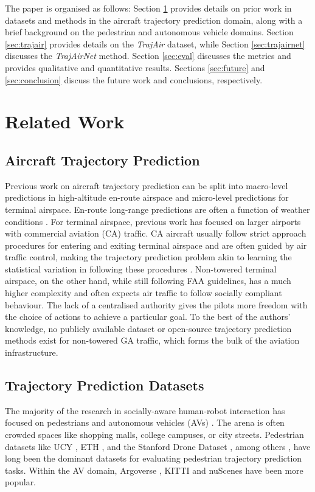 \documentclass[letterpaper, 10 pt, conference]{ieeeconf}
\begin{document}
The paper is organised as follows: Section \ref{sec:related_works} provides details on prior work in datasets and methods in the aircraft trajectory prediction domain, along with a brief background on the pedestrian and autonomous vehicle domains. Section \ref{sec:trajair} provides details on the \textit{TrajAir} dataset, while Section \ref{sec:trajairnet} discusses the \textit{TrajAirNet} method. Section \ref{sec:eval} discusses the metrics and provides qualitative and quantitative results. Sections \ref{sec:future} and \ref{sec:conclusion} discuss the future work and conclusions, respectively.

\section{Related Work}\label{sec:related_works}
\subsection{Aircraft Trajectory Prediction}
Previous work on aircraft trajectory prediction can be split into macro-level predictions in high-altitude en-route airspace and micro-level predictions for terminal airspace. En-route long-range predictions are often a function of weather conditions \cite{ayhan2016aircraft,pang2019recurrent,franco2018probabilistic,pang2020conditional}. For terminal airspace, previous work has focused on larger airports with commercial aviation (CA) traffic. CA aircraft usually follow strict approach procedures for entering and exiting terminal airspace and are often guided by air traffic control, making the trajectory prediction problem akin to learning the statistical variation in following these procedures \cite{zeng2020deep,barratt2018learning,alligier2018learning}. Non-towered terminal airspace, on the other hand, while still following FAA guidelines, has a much higher complexity and often expects air traffic to follow socially compliant behaviour. The lack of a centralised authority gives the pilots more freedom with the choice of actions to achieve a particular goal. To the best of the authors' knowledge, no publicly available dataset or open-source trajectory prediction methods exist for non-towered GA traffic, which forms the bulk of the aviation infrastructure.       
\subsection{Trajectory Prediction Datasets}
 The majority of the research in socially-aware human-robot interaction has focused on pedestrians and autonomous vehicles (AVs) \cite{deo2020trajectory,mangalam2020not,marchetti2020mantra,salzmann2020trajectron++,yuan2021agentformer}. The arena is often crowded spaces like shopping malls, college campuses, or city streets. Pedestrian datasets like UCY \cite{lerner2007crowds}, ETH \cite{pellegrini2010improving}, and the Stanford Drone Dataset \cite{robicquet2016learning}, among others \cite{rudenko2020human}, have long been the dominant datasets for evaluating pedestrian trajectory prediction tasks. Within the AV domain, Argoverse \cite{chang2019argoverse}, KITTI \cite{geiger2012we} and nuScenes \cite{caesar2020nuscenes} have been more popular.
 
\end{document}
